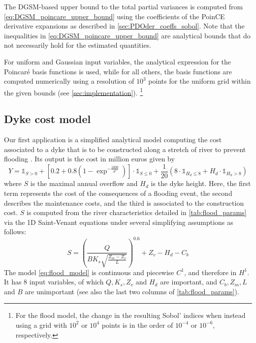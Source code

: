 \documentclass[a4paper,11pt]{article}
\renewcommand{\citep}[2][]{\cite[#1]{#2}}
\theoremstyle{definition}
\theoremstyle{remark}
\theoremstyle{theorem}
\begin{document}
The DGSM-based upper bound to the total partial variances is computed from \eqref{eq:DGSM_poincare_upper_bound} using the coefficients of the PoinCE derivative expansions as described in \cref{sec:PDOder_coeffs_sobol}.
Note that the inequalities in \eqref{eq:DGSM_poincare_upper_bound} are analytical bounds that do not necessarily hold for the estimated quantities.


For uniform and Gaussian input variables, the analytical expression for the Poincar\'e basis functions is used, while for all others, the basis functions are computed numerically using a resolution of $10^3$ points for the uniform grid within the given bounds (see \cref{sec:implementation}).%
\footnote{For the flood model, the change in the resulting Sobol' indices when instead using a grid with $10^2$ or $10^4$ points is in the order of $10^{-4}$ or $10^{-6}$, respectively.}


\subsection{Dyke cost model}
\label{sec:dyke_cost}
Our first application is a simplified analytical model computing the cost associated to a dyke that is to be constructed along a stretch of river to prevent flooding \citep{ioolem15,rougam20}. Its output is the cost in million euros given by
\begin{equation}
Y = \mathbb{1}_{S > 0} + \left[ 0.2 + 0.8 \left( 1 - \exp^{-\frac{1000}{S^4}} \right) \right] \cdot \mathbb{1}_{S \leq 0} + \frac{1}{20} \left( 8 \cdot \mathbb{1}_{H_d \leq 8} + H_d \cdot \mathbb{1}_{H_d > 8} \right)
\label{eq:flood_model}
\end{equation}
where $S$ is the maximal annual overflow and $H_d$ is the dyke height. Here, the first term represents the cost of the consequences of a flooding event, the second describes the maintenance costs, and the third is associated to the construction cost. $S$ is computed from the river characteristics detailed in \cref{tab:flood_params} via the 1D Saint-Venant equations under several simplifying assumptions as follows:
\begin{equation}
S = \left( \frac{Q}{B K_s \sqrt{\frac{Z_m - Z_v}{L}}}\right)^{\! 0.6} + Z_v - H_d - C_b
\label{eq:flood_model_overflow}
\end{equation}
The model \cref{eq:flood_model} is continuous and piecewise $C^1$, and therefore in $H^1$.
It has 8 input variables, of which $Q, K_s, Z_v$ and $H_d$ are important, and $C_b, Z_m, L$ and $B$ are unimportant (see also the last two columns of \cref{tab:flood_params}). 
\end{document}
